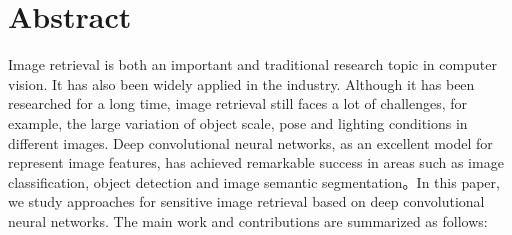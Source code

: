 
\chapter{Abstract}
Image retrieval is both an important and traditional research topic in computer vision. It has also been widely applied in the industry. Although it has been researched for a long time, image retrieval still faces a lot of challenges, for example, the large variation of object scale, pose and lighting conditions in different images. Deep convolutional neural networks, as an excellent model for represent image features, has achieved remarkable success in areas such as image classification, object detection and image semantic segmentation。In this paper, we study approaches for sensitive image retrieval based on deep convolutional neural networks. The main work and contributions are summarized as follows:

